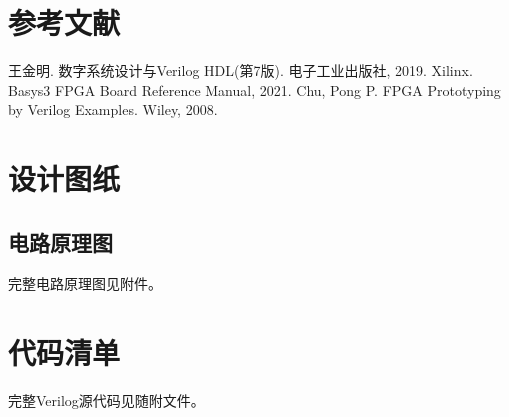 \documentclass[12pt, a4paper]{book}
\begin{document}


\backmatter
\chapter*{参考文献}
\begin{thebibliography}{99}
 王金明. 数字系统设计与Verilog HDL(第7版). 电子工业出版社, 2019.
 Xilinx. Basys3 FPGA Board Reference Manual, 2021.
 Chu, Pong P. FPGA Prototyping by Verilog Examples. Wiley, 2008.
\end{thebibliography}

\appendix
\chapter{设计图纸}
\section{电路原理图}
完整电路原理图见附件。

\chapter{代码清单}
完整Verilog源代码见随附文件。
\end{document}
